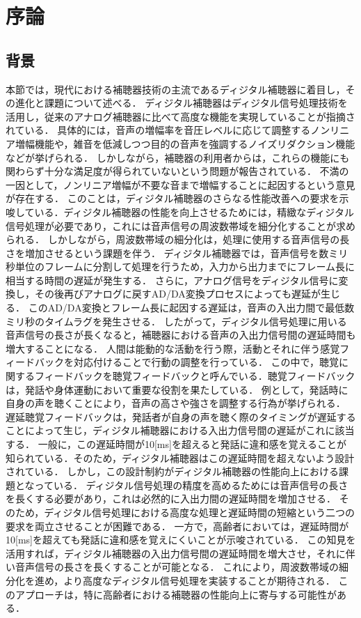 \chapter{序論}

\section{背景}
本節では，現代における補聴器技術の主流であるディジタル補聴器に着目し，その進化と課題について述べる．
ディジタル補聴器はディジタル信号処理技術を活用し，従来のアナログ補聴器に比べて高度な機能を実現していることが指摘されている\cite{EaringAids_20}\cite{EaringAids-2}．
具体的には，音声の増幅率を音圧レベルに応じて調整するノンリニア増幅機能や，雑音を低減しつつ目的の音声を強調するノイズリダクション機能などが挙げられる．
しかしながら，補聴器の利用者からは，これらの機能にも関わらず十分な満足度が得られていないという問題が報告されている\cite{Manzokudo}．
不満の一因として，ノンリニア増幅が不要な音まで増幅することに起因するという意見が存在する．
このことは，ディジタル補聴器のさらなる性能改善への要求を示唆している．ディジタル補聴器の性能を向上させるためには，精緻なディジタル信号処理が必要であり，これには音声信号の周波数帯域を細分化することが求められる．
しかしながら，周波数帯域の細分化は，処理に使用する音声信号の長さを増加させるという課題を伴う．
ディジタル補聴器では，音声信号を数ミリ秒単位のフレームに分割して処理を行うため，入力から出力までにフレーム長に相当する時間の遅延が発生する．
さらに，アナログ信号をディジタル信号に変換し，その後再びアナログに戻すAD/DA変換プロセスによっても遅延が生じる．
このAD/DA変換とフレーム長に起因する遅延は，音声の入出力間で最低数ミリ秒のタイムラグを発生させる．
したがって，ディジタル信号処理に用いる音声信号の長さが長くなると，補聴器における音声の入出力信号間の遅延時間も増大することになる．
人間は能動的な活動を行う際，活動とそれに伴う感覚フィードバックを対応付けることで行動の調整を行っている．
この中で，聴覚に関するフィードバックを聴覚フィードバックと呼んでいる\cite{DAF}．聴覚フィードバックは，発話や身体運動において重要な役割を果たしている．
例として，発話時に自身の声を聴くことにより，音声の高さや強さを調整する行為が挙げられる．
遅延聴覚フィードバックは，発話者が自身の声を聴く際のタイミングが遅延することによって生じ，ディジタル補聴器における入出力信号間の遅延がこれに該当する．
一般に，この遅延時間が10[ms]を超えると発話に違和感を覚えることが知られている\cite{DelayTime-ninnchi}．そのため，ディジタル補聴器はこの遅延時間を超えないよう設計されている\cite{EaringAids_20}．
しかし，この設計制約がディジタル補聴器の性能向上における課題となっている．
ディジタル信号処理の精度を高めるためには音声信号の長さを長くする必要があり，これは必然的に入出力間の遅延時間を増加させる．
そのため，ディジタル信号処理における高度な処理と遅延時間の短縮という二つの要求を両立させることが困難である．
一方で，高齢者においては，遅延時間が10[ms]を超えても発話に違和感を覚えにくいことが示唆されている．
この知見を活用すれば，ディジタル補聴器の入出力信号間の遅延時間を増大させ，それに伴い音声信号の長さを長くすることが可能となる．
これにより，周波数帯域の細分化を進め，より高度なディジタル信号処理を実装することが期待される．
このアプローチは，特に高齢者における補聴器の性能向上に寄与する可能性がある．
